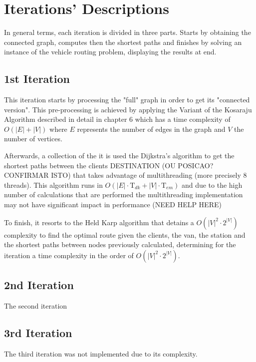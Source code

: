 \chapter{Iterations' Descriptions} \label{iterations}

In general terms, each iteration is divided in three parts. Starts by obtaining the connected graph, computes then the shortest paths and finishes by solving an instance of the vehicle routing problem, displaying the results at end.

\section{1st Iteration}
This iteration starts by processing the "full" graph in order to get its "connected version". This pre-processing is achieved by applying the Variant of the Kosaraju Algorithm described in detail in chapter 6 which has a time complexity of $O(|E| + |V|)$ where $E$ represents the number of edges in the graph and $V$ the number of vertices.\par
Afterwards, a collection of the it is used the Dijkstra's algorithm to get the shortest paths between the clients DESTINATION (OU POSICAO? CONFIRMAR ISTO) that takes advantage of multithreading (more precisely 8 threads). This algorithm runs in $O(|E|\cdot \text{T}_{dk}+|V|\cdot \text{T}_{em})$ and due to the high number of calculations that are performed the multithreading implementation may not have significant impact in performance (NEED HELP HERE)
\par
To finish, it resorts to the Held Karp algorithm that detains a $O(|V|^2 \cdot 2^{|V|})$ complexity to find the optimal route given the clients, the van, the station and the shortest paths between nodes previously calculated, determining for the iteration a time complexity in the order of $O(|V|^2 \cdot 2^{|V|})$.

\section{2nd Iteration}
The second iteration 

\section{3rd Iteration}
The third iteration was not implemented due to its complexity.

